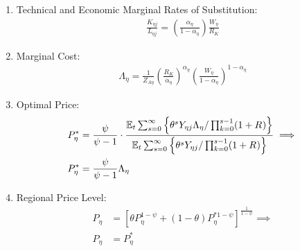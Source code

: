 \documentclass[../thesis.tex]{subfiles}
\begin{document}
\begin{enumerate}
	\item Technical and Economic Marginal Rates of Substitution:
	\begin{align}
		\frac{K_{\eta j}}{L_{\eta j}} = \left( \frac{{\alpha_{\eta}}}{1-\alpha_{\eta}} \right) \frac{W_{\eta}}{R_{K}} \label{eq_v2:reg-ss-int-good-firm-TMRS}
	\end{align}
	
	\begin{comment}
		
			\item Production Function:
		\begin{align}
			Y_{\eta j} = Z_{A\eta} L_{\eta j} \label{eq_v2:reg-ss-int-good-firm-production-function}
		\end{align}
		
		\item Marginal Cost:
		\begin{align}
			\Lambda_{\eta} = \frac{W_{\eta}}{Z_{A\eta}} \label{eq_v2:reg-ss-int-good-firm-FOC-Lt}
		\end{align}		
		
	\end{comment}
	
	\item Marginal Cost:
	\begin{align}
		\Lambda_{\eta} = \frac{1}{Z_{A\eta}} \left( \frac{R_{K}}{{\alpha_{\eta}}} \right)^{{\alpha_{\eta}}} \left( \frac{W_{\eta}}{1-\alpha_{\eta}} \right)^{1-\alpha_{\eta}} \label{eq_v2:reg-ss-int-good-firm-MC-2}
	\end{align}
	
	\item Optimal Price:
	\begin{align}
		P_{\eta}^{\ast} &= \frac{\psi}{\psi-1} \cdot \frac{ {\mathbb{E}_{t}} \sum_{s=0}^{\infty} \left\{ \theta^s Y_{\eta j} \Lambda_{\eta} / \prod_{k=0}^{s-1}(1+R_{}) \right\}} {{\mathbb{E}_{t}} \sum_{s=0}^{\infty} \left\{ \theta^s Y_{\eta j} / \prod_{k=0}^{s-1}(1 + R_{}) \right\}} \implies \nonumber \\
		P_{\eta}^{\ast} &= \frac{\psi}{\psi-1} \Lambda_{\eta} \label{eq_v2:reg-ss-int-good-firm-optimal-price-FOC-3}
	\end{align}
	
	\item Regional Price Level:
	\begin{align}
		P_{\eta} &= \left[ \theta P_{\eta}^{1-\psi} + (1-\theta) P_{\eta}^{\ast 1-\psi} \right]^\frac{1}{1-\psi} \implies \nonumber \\
		P_{\eta} &= P_{\eta}^{\ast} \label{eq_v2:reg-ss-general-price-level}
	\end{align}
	

\end{enumerate}
\end{document}
